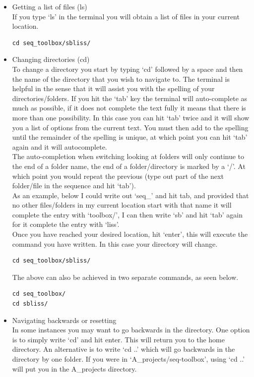 \begin{itemize}
\item Getting a list of files (ls)\\
If you type `ls' in the terminal you will obtain a list of files in your current location.
\begin{lstlisting}
cd seq_toolbox/sbliss/
\end{lstlisting}
\item Changing directories (cd)\\
To change a directory you start by typing `cd' followed by a space and then the name of the directory that you wish to navigate to. The terminal is helpful in the sense that it will assist you with the spelling of your directories/folders. If you hit the `tab' key the terminal will auto-complete as much as possible, if it does not complete the text fully it means that there is more than one possibility. In this case you can hit `tab' twice and it will show you a list of options from the current text. You must then add to the spelling until the remainder of the spelling is unique, at which point you can hit `tab' again and it will autocomplete.\\
The auto-completion when switching looking at folders will only continue to the end of a folder name, the end of a folder/directory is marked by a `/'. At which point you would repeat the previous (type out part of the next folder/file in the sequence and hit `tab').\\
As an example, below I could write out `seq\_' and hit tab, and provided that no other files/folders in my current location start with that name it will complete the entry with `toolbox/', I can then write `sb' and hit `tab' again for it complete the entry with `liss'.\\
Once you have reached your desired location, hit `enter', this will execute the command you have written. In this case your directory will change.
\begin{lstlisting}
cd seq_toolbox/sbliss/
\end{lstlisting}
The above can also be achieved in two separate commands, as seen below.
\begin{lstlisting}
cd seq_toolbox/
cd sbliss/
\end{lstlisting}


\item Navigating backwards or resetting\\
In some instances you may want to go backwards in the directory. One option is to simply write `cd' and hit enter. This will return you to the home directory. An alternative is to write `cd ..' which will go backwards in the directory by one folder. If you were in `A\_projects/seq-toolbox', using `cd ..' will put you in the A\_projects directory.


\end{itemize}
